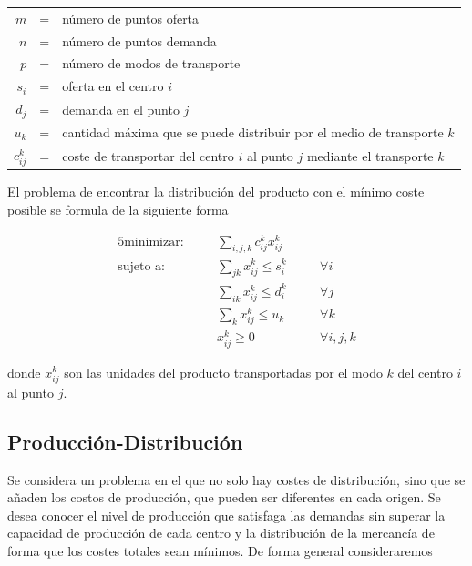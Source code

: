 \begin{center}
    \begin{tabular}{rcl}
        $m$         & = & número de puntos oferta \\
        $n$         & = & número de puntos demanda \\
        $p$         & = & número de modos de transporte \\
        $s_i$       & = & oferta en el centro $i$ \\
        $d_j$       & = & demanda en el punto $j$ \\
        $u_k$       & = & cantidad máxima que se puede distribuir por el medio de transporte $k$ \\
        $c_{ij}^k$  & = & coste de transportar del centro $i$ al punto $j$ mediante el transporte $k$ \\
    \end{tabular}
\end{center}

\newpage

El problema de encontrar la distribución del producto con el mínimo coste posible se formula de la siguiente forma

\begin{alignat}{5}
    \text{minimizar:}   & \quad & \sum_{i,j,k}c_{ij}^kx_{ij}^k  & \quad &               \\
    \text{sujeto a:}    & \quad & \sum_{jk}x_{ij}^k\leq s_i^k   &       & \forall i     \\
                        & \quad & \sum_{ik}x_{ij}^k\leq d_i^k   &       & \forall j     \\
                        & \quad & \sum_kx_{ij}^k\leq u_k        &       & \forall k     \\
                        & \quad & x_{ij}^k\geq 0                &       & \forall i,j,k           
\end{alignat}

donde $x_{ij}^k$ son las unidades del producto transportadas por el modo $k$ del centro $i$ al punto $j$.

\subsection{Producción-Distribución}

Se considera un problema en el que no solo hay costes de distribución, sino que se añaden los costos de producción, que
pueden ser diferentes en cada origen. Se desea conocer el nivel de producción que satisfaga las demandas sin superar
la capacidad de producción de cada centro y la distribución de la mercancía de forma que los costes totales sean mínimos. De
forma general consideraremos

